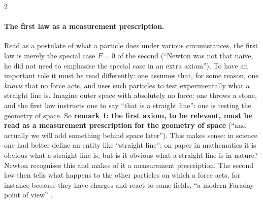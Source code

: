 \begin{paracol}{2}
\paragraph{The first law as a measurement prescription.} Read as a postulate of what a particle does under various circumstances, the first law is merely the special case $F=0$ of the second (``Newton was not that naive, he did not need to emphasise the special case in an extra axiom''). To have an important role it must be read differently: one assumes that, for some reason, one \emph{knows} that no force acts, and uses such particles to test experimentally what a straight line is. Imagine outer space with absolutely no force: one throws a stone, and the first law instructs one to say ``that is a straight line'': one is testing the geometry of space.
So \textbf{remark 1: the first axiom, to be relevant, must be read as a measurement prescription for the geometry of space} (``and actually we will add something behind space later''). This makes sense: in science one had better define an entity like ``straight line''; on paper in mathematics it is obvious what a straight line is, but is it obvious what a straight line is in nature? Newton recognises this and makes of it a measurement prescription. The second law then tells what happens to the other particles on which a force acts, for instance because they have charges and react to some fields, ``a modern Faraday point of view''
.


\end{paracol}
